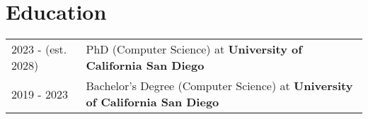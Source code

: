 \section{Education}
\begin{tabularx}{\linewidth}{@{}l X@{}}
	2023 - (est. 2028) & PhD (Computer Science) at \textbf{University of California San Diego}               \\
	2019 - 2023        & Bachelor's Degree (Computer Science) at \textbf{University of California San Diego} \\
\end{tabularx}

